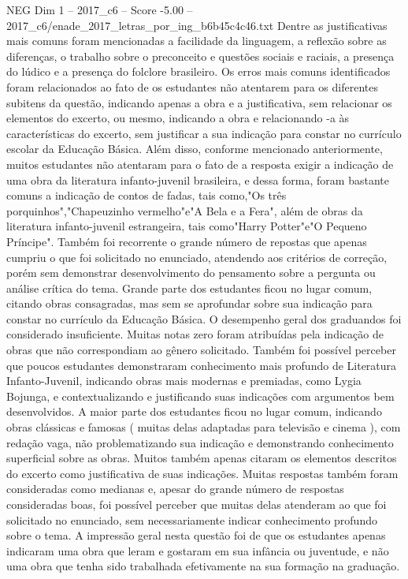 \begin{textsample}{NEG Dim 1 – 2017\_c6 – Score -5.00 – 2017\_c6/enade\_2017\_letras\_por\_ing\_b6b45c4c46.txt}
Dentre as justificativas mais comuns foram mencionadas a facilidade da linguagem, a reflexão sobre as diferenças, o trabalho sobre o preconceito e questões sociais e raciais, a presença do lúdico e a presença do folclore brasileiro.
Os erros mais comuns identificados foram relacionados ao fato de os estudantes não atentarem para os diferentes subitens da questão, indicando apenas a obra e a justificativa, sem relacionar os elementos do excerto, ou mesmo, indicando a obra e relacionando -a às características do excerto, sem justificar a sua indicação para constar no currículo escolar da Educação Básica.
Além disso, conforme mencionado anteriormente, muitos estudantes não atentaram para o fato de a resposta exigir a indicação de uma obra da literatura infanto-juvenil brasileira, e dessa forma, foram bastante comuns a indicação de contos de fadas, tais como,"Os três porquinhos","Chapeuzinho vermelho"e"A Bela e a Fera", além de obras da literatura infanto-juvenil estrangeira, tais como"Harry Potter"e"O Pequeno Príncipe".
Também foi recorrente o grande número de repostas que apenas cumpriu o que foi solicitado no enunciado, atendendo aos critérios de correção, porém sem demonstrar desenvolvimento do pensamento sobre a pergunta ou análise crítica do tema.
Grande parte dos estudantes ficou no lugar comum, citando obras consagradas, mas sem se aprofundar sobre sua indicação para constar no currículo da Educação Básica.
O desempenho geral dos graduandos foi considerado insuficiente.
Muitas notas zero foram atribuídas pela indicação de obras que não correspondiam ao gênero solicitado.
Também foi possível perceber que poucos estudantes demonstraram conhecimento mais profundo de Literatura Infanto-Juvenil, indicando obras mais modernas e premiadas, como Lygia Bojunga, e contextualizando e justificando suas indicações com argumentos bem desenvolvidos.
A maior parte dos estudantes ficou no lugar comum, indicando obras clássicas e famosas ( muitas delas adaptadas para televisão e cinema ), com redação vaga, não problematizando sua indicação e demonstrando conhecimento superficial sobre as obras.
Muitos também apenas citaram os elementos descritos do excerto como justificativa de suas indicações.
Muitas respostas também foram consideradas como medianas e, apesar do grande número de respostas consideradas boas, foi possível perceber que muitas delas atenderam ao que foi solicitado no enunciado, sem necessariamente indicar conhecimento profundo sobre o tema.
A impressão geral nesta questão foi de que os estudantes apenas indicaram uma obra que leram e gostaram em sua infância ou juventude, e não uma obra que tenha sido trabalhada efetivamente na sua formação na graduação.

\end{textsample}
